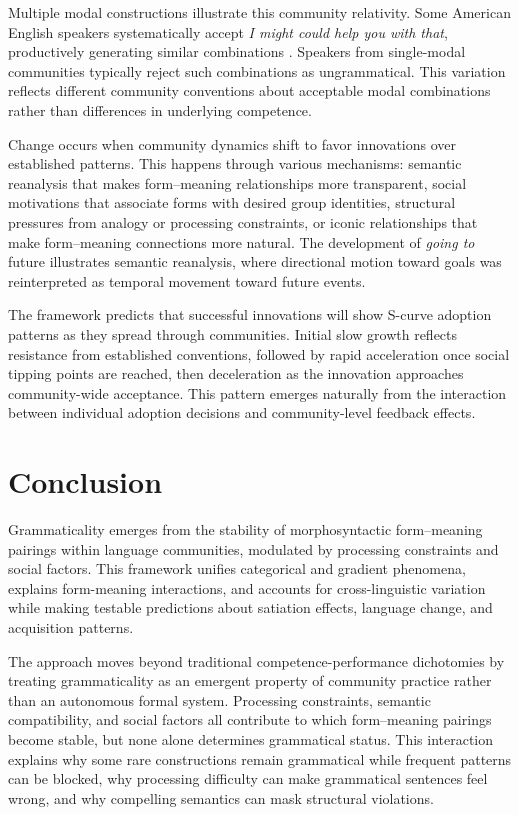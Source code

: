 \documentclass[12pt]{article}
\begin{document}
Multiple modal constructions illustrate this community relativity. Some American English speakers systematically accept \textit{I might could help you with that}, productively generating similar combinations \parencite{morin2024semantics}. Speakers from single-modal communities typically reject such combinations as ungrammatical. This variation reflects different community conventions about acceptable modal combinations rather than differences in underlying competence.

Change occurs when community dynamics shift to favor innovations over established patterns. This happens through various mechanisms: semantic reanalysis that makes form–meaning relationships more transparent, social motivations that associate forms with desired group identities, structural pressures from analogy or processing constraints, or iconic relationships that make form–meaning connections more natural. The development of \textit{going to} future illustrates semantic reanalysis, where directional motion toward goals was reinterpreted as temporal movement toward future events.

The framework predicts that successful innovations will show S-curve adoption patterns as they spread through communities. Initial slow growth reflects resistance from established conventions, followed by rapid acceleration once social tipping points are reached, then deceleration as the innovation approaches community-wide acceptance. This pattern emerges naturally from the interaction between individual adoption decisions and community-level feedback effects.

\section{Conclusion}

Grammaticality emerges from the stability of morphosyntactic form–meaning pairings within language communities, modulated by processing constraints and social factors. This framework unifies categorical and gradient phenomena, explains form-meaning interactions, and accounts for cross-linguistic variation while making testable predictions about satiation effects, language change, and acquisition patterns.

The approach moves beyond traditional competence-performance dichotomies by treating grammaticality as an emergent property of community practice rather than an autonomous formal system. Processing constraints, semantic compatibility, and social factors all contribute to which form–meaning pairings become stable, but none alone determines grammatical status. This interaction explains why some rare constructions remain grammatical while frequent patterns can be blocked, why processing difficulty can make grammatical sentences feel wrong, and why compelling semantics can mask structural violations.
\end{document}

